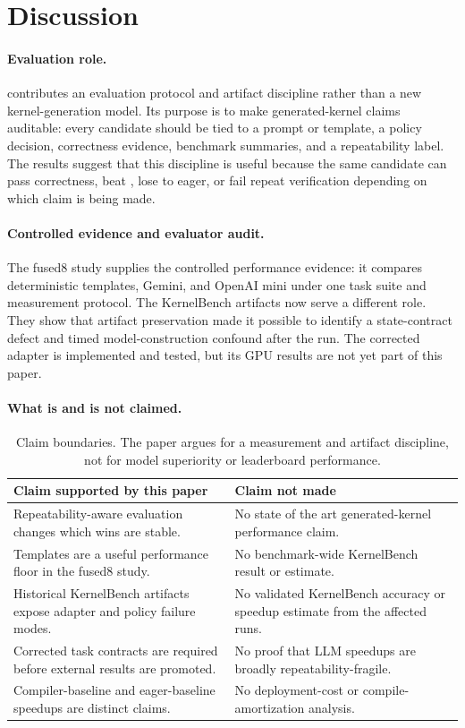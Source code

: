 \section{Discussion}

\paragraph{Evaluation role.}
\okf{} contributes an evaluation protocol and artifact discipline rather than a new kernel-generation model. Its purpose is to make generated-kernel claims auditable: every candidate should be tied to a prompt or template, a policy decision, correctness evidence, benchmark summaries, and a repeatability label. The results suggest that this discipline is useful because the same candidate can pass correctness, beat \compile{}, lose to eager, or fail repeat verification depending on which claim is being made.

\paragraph{Controlled evidence and evaluator audit.}
The fused8 study supplies the controlled performance evidence: it compares deterministic templates, Gemini, and OpenAI mini under one task suite and measurement protocol. The KernelBench artifacts now serve a different role. They show that artifact preservation made it possible to identify a state-contract defect and timed model-construction confound after the run. The corrected adapter is implemented and tested, but its GPU results are not yet part of this paper.

\paragraph{What is and is not claimed.}
\begin{table}[htbp]
\centering
\caption{Claim boundaries. The paper argues for a measurement and artifact discipline, not for model superiority or leaderboard performance.}
\label{tab:claim-boundaries}
\small
\begin{tabularx}{\linewidth}{Y Y}
\toprule
Claim supported by this paper & Claim not made \\
\midrule
Repeatability-aware evaluation changes which wins are stable. & No state of the art generated-kernel performance claim. \\
Templates are a useful performance floor in the fused8 study. & No benchmark-wide KernelBench result or estimate. \\
Historical KernelBench artifacts expose adapter and policy failure modes. & No validated KernelBench accuracy or speedup estimate from the affected runs. \\
Corrected task contracts are required before external results are promoted. & No proof that LLM speedups are broadly repeatability-fragile. \\
Compiler-baseline and eager-baseline speedups are distinct claims. & No deployment-cost or compile-amortization analysis. \\
\bottomrule
\end{tabularx}
\end{table}

